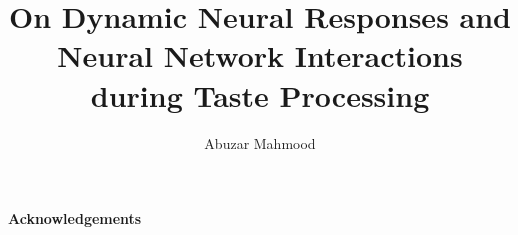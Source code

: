 \documentclass[openany,oneside]{brandeis-dissertation3.12}
\title{On Dynamic Neural Responses and Neural Network Interactions during Taste Processing}
\author{Abuzar Mahmood}
\begin{document}
\maketitlepage
\makeapproval

\newpage
\begin{center}
\mbox{}
\vfill
{}
\end{center}

\let\cleardoublepage\clearpage

\frontmatter
\setcounter{page}{4}


\vspace*{-0.25in}
\begin{center}
\textbf{Acknowledgements}
\end{center}
\\
\linespread{2}
\end{document}
